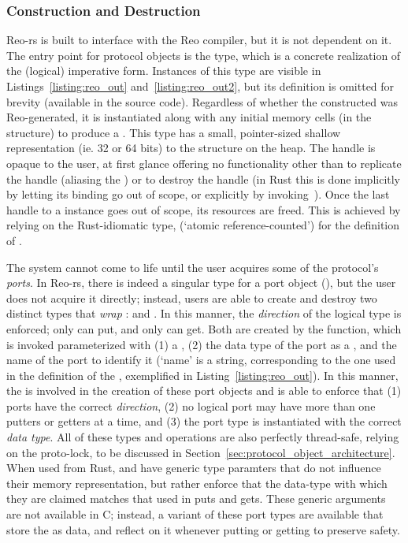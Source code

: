 \subsubsection{Construction and Destruction}
\label{sec:construction_and_destruction}
Reo-rs is built to interface with the Reo compiler, but it is not dependent on it. The entry point for protocol objects is the  type, which is a concrete realization of the (logical) imperative form. Instances of this type are visible in Listings~\ref{listing:reo_out} and~\ref{listing:reo_out2}, but its definition is omitted for brevity (available in the source code). Regardless of whether the constructed  was Reo-generated, it is instantiated along with any initial memory cells (in the  structure) to produce a . This type has a small, pointer-sized shallow representation (ie. 32 or 64 bits) to the  structure on the heap. The handle is opaque to the user, at first glance offering no functionality other than to replicate the handle (aliasing the ) or to destroy the handle (in Rust this is done implicitly by letting its binding go out of scope, or explicitly by invoking~). Once the last handle to a  instance goes out of scope, its resources are freed. This is achieved by relying on the Rust-idiomatic  type, (`atomic reference-counted') for the definition of .

The system cannot come to life until the user acquires some of the protocol's \textit{ports}. In Reo-rs, there is indeed a singular type for a port object (), but the user does not acquire it directly; instead, users are able to create and destroy two distinct types that \textit{wrap} :  and . In this manner, the \textit{direction} of the logical type is enforced; only  can put, and only  can get. Both are created by the  function, which is invoked parameterized with (1) a , (2) the data type of the port as a , and the name of the port to identify it (`name' is a string, corresponding to the one used in the definition of the , exemplified in Listing~\ref{listing:reo_out}). In this manner, the  is involved in the creation of these port objects and is able to enforce that (1) ports have the correct \textit{direction}, (2) no logical port may have more than one putters or getters at a time, and (3) the port type is instantiated with the correct \textit{data type}. All of these types and operations are also perfectly thread-safe, relying on the proto-lock, to be discussed in Section~\ref{sec:protocol_object_architecture}. When used from Rust,  and  have generic type paramters that do not influence their memory representation, but rather enforce that the data-type with which they are claimed matches that used in puts and gets. These generic arguments are not available in C; instead, a variant of these port types are available that store the  as data, and reflect on it whenever putting or getting to preserve safety.

